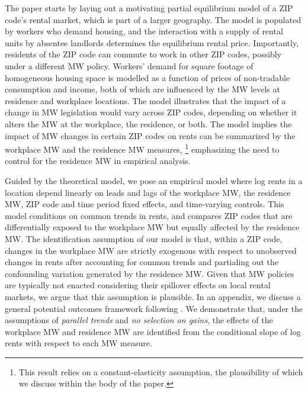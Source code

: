 
The paper starts by laying out a motivating partial equilibrium model of a ZIP 
code's rental market, which is part of a larger geography.
The model is populated by workers who demand housing, and the interaction with 
a supply of rental units by absentee landlords determines the equilibrium rental 
price.
Importantly, residents of the ZIP code can commute to work in other ZIP 
codes, possibly under a different MW policy.
Workers' demand for square footage of homogeneous housing space is modelled as 
a function of prices of non-tradable consumption and income, both of which are 
influenced by the MW levels at residence and workplace locations.
The model illustrates that the impact of a change in MW legislation would vary 
across ZIP codes, depending on whether it alters the MW at the workplace,
the residence, or both.
The model implies the impact of MW changes in certain ZIP codes on rents can 
be summarized by the workplace MW and the residence MW measures,%
\footnote{This result relies on a constant-elasticity assumption, the 
    plausibility of which we discuss within the body of the paper.}
emphasizing the need to control for the residence MW in empirical analysis.


Guided by the theoretical model, we pose an empirical model where log rents in 
a location depend linearly on
leads and lags of the workplace MW,
the residence MW,
ZIP code and time period fixed effects, and 
time-varying controls.
This model conditions on common trends in rents, and compares ZIP codes
that are differentially exposed to the workplace MW but equally affected by the 
residence MW.
The identification assumption of our model is that, within a ZIP code, 
changes in the workplace MW are strictly exogenous with respect to 
unobserved changes in rents after accounting for common trends and 
partialing out the confounding variation generated by the residence MW.
Given that MW policies are typically not enacted considering their spillover
effects on local rental markets, we argue that this assumption is plausible.
In an appendix, we discuss a general potential outcomes framework following
\textcite{CallawayEtAl2021}.
We demonstrate that, under the assumptions of \textit{parallel trends} and 
\textit{no selection on gains}, 
the effects of the workplace MW and residence MW are identified from the 
conditional slope of log rents with respect to each MW measure.

